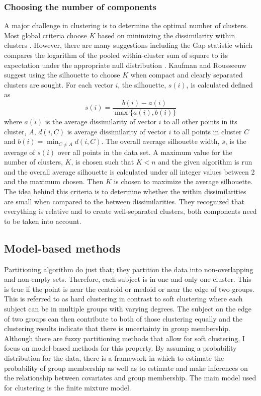 \subsubsection{Choosing the number of components}
A major challenge in clustering is to determine the optimal number of clusters. Most global criteria choose $K$ based on minimizing the dissimilarity within clusters \cite{gordon1999}. However, there are many suggestions including the Gap statistic which compares the logarithm of the pooled within-cluster sum of square to its expectation under the appropriate null distribution \cite{tibshirani2001}. Kaufman and Rousseeuw suggest using the silhouette to choose $K$ \cite{kaufman1990} when compact and clearly separated clusters are sought. For each vector $i$, the silhouette, $s(i)$, is calculated defined as
$$s(i)=\frac{b(i)-a(i)}{\max\{a(i),b(i)\}}$$
where $a(i)$ is the average dissimilarity of  vector $i$ to all other points in its cluster, $A$, $d(i,C)$ is average dissimilarity of vector $i$ to all points in cluster $C$ and $b(i)=\min_{C\not= A} d(i,C)$. The overall average silhouette width, $\bar{s}$, is the average of $s(i)$ over all points in the data set. A maximum value for the number of clusters, $K$, is chosen such that $K<n$ and the given algorithm is run and the overall average silhouette is calculated under all integer values between 2 and the maximum chosen. Then $K$ is chosen to maximize the average silhouette. The idea behind this criteria is to determine whether the within dissimilarities are small when compared to the between dissimilarities. They recognized that everything is relative and to create well-separated clusters, both components need to be taken into account.

\subsection{Model-based methods}
Partitioning algorithm do just that; they partition the data into non-overlapping and non-empty sets. Therefore, each subject is in one and only one cluster. This is true if the point is near the centroid or medoid or near the edge of two groups. This is referred to as hard clustering in contrast to soft clustering where each subject can be in multiple groups with varying degrees. The subject on the edge of two groups can then contribute to both of those clustering equally and the clustering results indicate that there is uncertainty in group membership. Although there are fuzzy partitioning methods that allow for soft clustering, I focus on model-based methods for this property. By assuming a probability distribution for the data, there is a framework in which to estimate the probability of group membership as well as to estimate and make inferences on the relationship between covariates and group membership. The main model used for clustering is the finite mixture model. 


